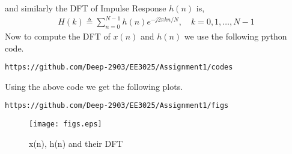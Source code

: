 \documentclass[journal,12pt,twocolumn]{IEEEtran}
\begin{document}
and similarly the DFT of Impulse Response $h(n)$ is,
\begin{align}
    H(k) \triangleq \sum_{n=0}^{N-1}h(n)e^{-j2\pi kn/N},\quad k=0,1, \ldots, N-1 \label{eq:2.0.3}
\end{align}
Now to compute the DFT of $x(n)$ and $h(n)$ we use the following python code.
\begin{lstlisting}
https://github.com/Deep-2903/EE3025/Assignment1/codes
\end{lstlisting}
Using the above code we get the following plots.
\begin{lstlisting}
https://github.com/Deep-2903/EE3025/Assignment1/figs
\end{lstlisting}
\begin{figure}[h!]
    \centering
    \texttt{[image: figs.eps]}
    \caption{x(n), h(n) and their DFT}
    \label{figs}
\end{figure}
\end{document}
